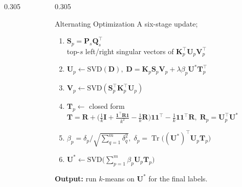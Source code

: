\documentclass[final,t]{beamer}
\newcommand{\capfont}{\fontsize{24}{30}\selectfont}
\begin{document}
\begin{frame}[t]
\begin{columns}[t]
\begin{column}{0.305\paperwidth}
%
%
%

\end{column}

\begin{column}{0.305\paperwidth}

\begin{block}{Alternating Optimization}
\vspace{0.1cm}
A six-stage update; %
\begin{enumerate}
  \item $\mathbf{S}_p=\mathbf{P}_s\mathbf{Q}_s^{\!\top}$\\
        {\capfont top-$s$ left/right singular vectors of
        $\mathbf{K}_p^{\!\top}\mathbf{U}_p\mathbf{V}_p^{\!\top}$}
  \item $\mathbf{U}_p\leftarrow\mathrm{SVD}(\mathbf{D}),\;
        \mathbf{D}=\mathbf{K}_p\mathbf{S}_p\mathbf{V}_p+\lambda\beta_p\mathbf{U}^{\!\ast}\mathbf{T}_p^{\!\top}$
  \item $\mathbf{V}_p\leftarrow\mathrm{SVD}(\mathbf{S}_p^{\!\top}\mathbf{K}_p^{\!\top}\mathbf{U}_p)$
  \item $\mathbf{T}_p\leftarrow$ closed form\\
        {\capfont $\mathbf{T}=\mathbf{R}+\big(\tfrac{1}{k}\mathbf{I}+\tfrac{\mathbf{1}^{\!\top}\mathbf{R}\mathbf{1}}{k^2}-\tfrac{1}{k}\mathbf{R}\big)\mathbf{1}\mathbf{1}^{\!\top}-\tfrac{1}{k}\mathbf{1}\mathbf{1}^{\!\top}\mathbf{R},\;\mathbf{R}_p=\mathbf{U}_p^{\!\top}\mathbf{U}^{\!\ast}$}
  \item $\beta_p=\delta_p\big/\sqrt{\textstyle\sum_{q=1}^{m}\delta_q^2},\;
        \delta_p=\operatorname{Tr}\!\big((\mathbf{U}^{\!\ast})^{\!\top}\mathbf{U}_p\mathbf{T}_p\big)$
  \item $\mathbf{U}^{\!\ast}\leftarrow\mathrm{SVD}\!\big(\textstyle\sum_{p=1}^{m}\beta_p\mathbf{U}_p\mathbf{T}_p\big)$
\end{enumerate}
\vspace{0.1cm}
\textbf{Output:} run $k$-means on $\mathbf{U}^{\!\ast}$ for the final labels.
\end{block}


\end{column}
\end{columns}
\end{frame}
\end{document}
